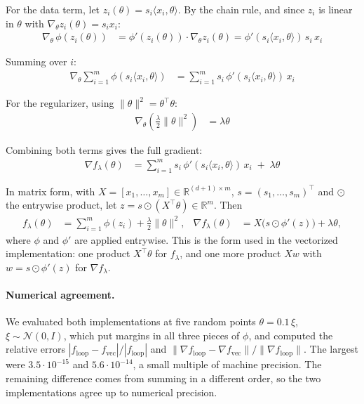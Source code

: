 \documentclass[12pt]{article}
\begin{document}
For the data term, let $z_i(\theta) = s_i\langle x_i,\theta\rangle$. By the chain rule, and since $z_i$ is linear in $\theta$ with $\nabla_\theta z_i(\theta) = s_i x_i$:
\begin{align*}
\nabla_\theta\, \phi(z_i(\theta)) &= \phi'(z_i(\theta))\cdot \nabla_\theta z_i(\theta) = \phi'(s_i\langle x_i,\theta\rangle)\, s_i\, x_i
\end{align*}

Summing over $i$:
\begin{align*}
\nabla_\theta \sum_{i=1}^m \phi(s_i\langle x_i,\theta\rangle) &= \sum_{i=1}^m s_i\, \phi'(s_i\langle x_i,\theta\rangle)\, x_i
\end{align*}

For the regularizer, using $\|\theta\|^2 = \theta^\top\theta$:
\begin{align*}
\nabla_\theta\left(\frac{\lambda}{2}\|\theta\|^2\right) &= \lambda\theta
\end{align*}

Combining both terms gives the full gradient:
\begin{align*}
\nabla f_\lambda(\theta) &= \sum_{i=1}^m s_i\, \phi'(s_i\langle x_i,\theta\rangle)\, x_i \;+\; \lambda\theta
\end{align*}

In matrix form, with $X = [x_1, \dots, x_m] \in \mathbb{R}^{(d+1)\times m}$,
$s = (s_1, \dots, s_m)^\top$ and $\odot$ the entrywise product, let
$z = s \odot (X^\top \theta) \in \mathbb{R}^m$. Then
\begin{align*}
f_\lambda(\theta) &= \sum_{i=1}^m \phi(z_i) + \frac{\lambda}{2}\|\theta\|^2,
&
\nabla f_\lambda(\theta) &= X\bigl(s \odot \phi'(z)\bigr) + \lambda\theta,
\end{align*}
where $\phi$ and $\phi'$ are applied entrywise. This is the form used in the
vectorized implementation: one product $X^\top\theta$ for $f_\lambda$, and one
more product $Xw$ with $w = s \odot \phi'(z)$ for $\nabla f_\lambda$.

\paragraph{Numerical agreement.}
We evaluated both implementations at five random points
$\theta = 0.1\,\xi$, $\xi \sim \mathcal{N}(0, I)$, which put margins in all
three pieces of $\phi$, and computed the relative errors
$|f_{\text{loop}} - f_{\text{vec}}| / |f_{\text{loop}}|$ and
$\|\nabla f_{\text{loop}} - \nabla f_{\text{vec}}\| / \|\nabla f_{\text{loop}}\|$.
The largest were $3.5 \cdot 10^{-15}$ and $5.6 \cdot 10^{-14}$, a small
multiple of machine precision. The remaining difference comes from summing in a
different order, so the two implementations agree up to numerical precision.
\end{document}
